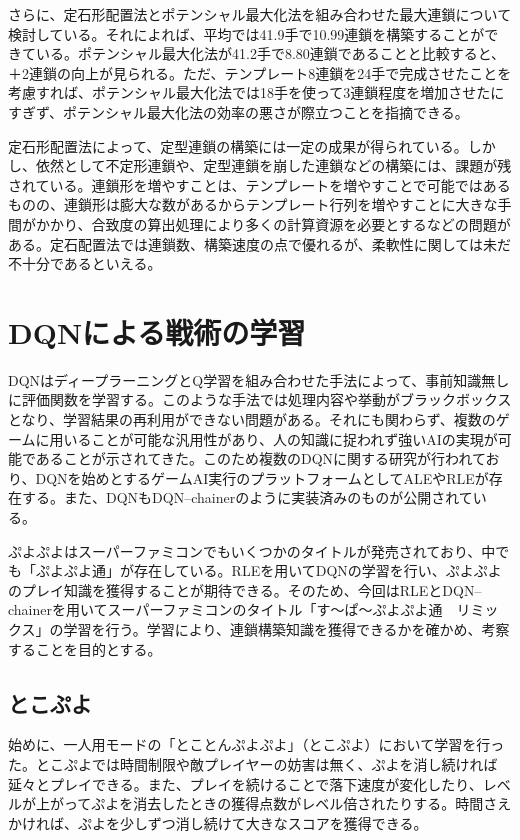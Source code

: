 \documentclass[12pt]{jreport}
\begin{document}
さらに、定石形配置法とポテンシャル最大化法を組み合わせた最大連鎖について検討している。それによれば、平均では41.9手で10.99連鎖を構築することができている。ポテンシャル最大化法が41.2手で8.80連鎖であることと比較すると、＋2連鎖の向上が見られる。ただ、テンプレート8連鎖を24手で完成させたことを考慮すれば、ポテンシャル最大化法では18手を使って3連鎖程度を増加させたにすぎず、ポテンシャル最大化法の効率の悪さが際立つことを指摘できる。

定石形配置法によって、定型連鎖の構築には一定の成果が得られている。しかし、依然として不定形連鎖や、定型連鎖を崩した連鎖などの構築には、課題が残されている。連鎖形を増やすことは、テンプレートを増やすことで可能ではあるものの、連鎖形は膨大な数があるからテンプレート行列を増やすことに大きな手間がかかり、合致度の算出処理により多くの計算資源を必要とするなどの問題がある。定石配置法では連鎖数、構築速度の点で優れるが、柔軟性に関しては未だ不十分であるといえる。


\chapter{DQNによる戦術の学習} \label{dqn} \setcounter{section}{0}
DQNはディープラーニングとQ学習を組み合わせた手法によって、事前知識無しに評価関数を学習する。このような手法では処理内容や挙動がブラックボックスとなり、学習結果の再利用ができない問題がある。それにも関わらず、複数のゲームに用いることが可能な汎用性があり、人の知識に捉われず強いAIの実現が可能であることが示されてきた。このため複数のDQNに関する研究が行われており、DQNを始めとするゲームAI実行のプラットフォームとしてALE\cite{ALE}やRLE\cite{RLE}が存在する。また、DQNもDQN--chainer\cite{DQN_chainer}のように実装済みのものが公開されている。

ぷよぷよはスーパーファミコンでもいくつかのタイトルが発売されており、中でも「ぷよぷよ通」が存在している。RLEを用いてDQNの学習を行い、ぷよぷよのプレイ知識を獲得することが期待できる。そのため、今回はRLEとDQN--chainerを用いてスーパーファミコンのタイトル「す～ぱ～ぷよぷよ通　リミックス」の学習を行う。学習により、連鎖構築知識を獲得できるかを確かめ、考察することを目的とする。


\section{とこぷよ}
始めに、一人用モードの「とことんぷよぷよ」（とこぷよ）において学習を行った。とこぷよでは時間制限や敵プレイヤーの妨害は無く、ぷよを消し続ければ延々とプレイできる。また、プレイを続けることで落下速度が変化したり、レベルが上がってぷよを消去したときの獲得点数がレベル倍されたりする。時間さえかければ、ぷよを少しずつ消し続けて大きなスコアを獲得できる。
\end{document}
